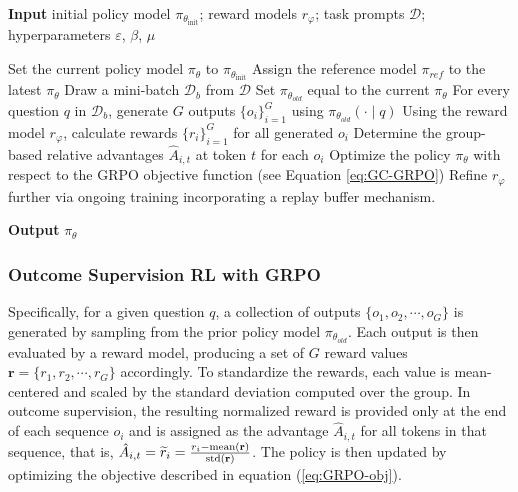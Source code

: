 \begin{itemize}[topsep=0pt]
\begin{itemize}[topsep=0pt]
\begin{algorithm}[t]
  \small
  \caption{Iterative Group Relative Policy Optimization}
  \textbf{Input} initial policy model $\pi_{\theta_{\text{init}}}$; reward models $r_\varphi$; task prompts $\mathcal{D}$; 
  hyperparameters $\varepsilon$, $\beta$, $\mu$
  \begin{algorithmic}[1]
    \State Set the current policy model $\pi_\theta$ to $\pi_{\theta_{\text{init}}}$
      \State Assign the reference model $\pi_{ref}$ to the latest $\pi_\theta$
        \State Draw a mini-batch $\mathcal{D}_b$ from $\mathcal{D}$
        \State Set $\pi_{\theta_{old}}$ equal to the current $\pi_\theta$
        \State For every question $q$ in $\mathcal{D}_b$, generate $G$ outputs $\{o_i\}_{i=1}^G$ using $\pi_{\theta_{old}} (\cdot \mid q)$
        \State Using the reward model $r_{\varphi}$, calculate rewards $\{r_i\}_{i=1}^{G}$ for all generated $o_i$
        \State Determine the group-based relative advantages $\hat{A}_{i,t}$ at token $t$ for each $o_i$
          \State Optimize the policy $\pi_\theta$ with respect to the GRPO objective function (see Equation \ref{eq:GC-GRPO})
        \EndFor
      \EndFor 
      \State Refine $r_\varphi$ further via ongoing training incorporating a replay buffer mechanism.
    \EndFor
  \end{algorithmic}
  \textbf{Output} $\pi_\theta$
  \label{alg:iter-grpo}
\end{algorithm}

\subsubsection{Outcome Supervision RL with GRPO} Specifically, for a given question $q$, a collection of outputs $\{o_1, o_2, \cdots, o_G\}$ is generated by sampling from the prior policy model $\pi_{\theta_{old}}$. Each output is then evaluated by a reward model, producing a set of $G$ reward values $\mathbf{r} = \{r_1, r_2, \cdots, r_G\}$ accordingly. To standardize the rewards, each value is mean-centered and scaled by the standard deviation computed over the group. In outcome supervision, the resulting normalized reward is provided only at the end of each sequence $o_i$ and is assigned as the advantage $\hat{A}_{i, t}$ for all tokens in that sequence, that is, $\hat{A}_{i, t} = \widetilde{r}_i = \frac{r_i- {\rm mean}(\mathbf{r})}{{\rm std}(\mathbf{r})}$. The policy is then updated by optimizing the objective described in equation (\ref{eq:GRPO-obj}).


\end{itemize}
\end{itemize}
